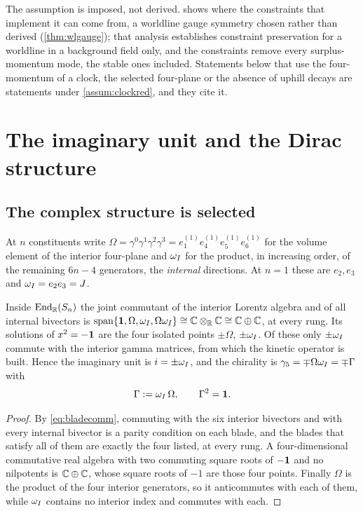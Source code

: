 The assumption is imposed, not derived.  shows where the constraints that implement it can come from, a worldline
gauge symmetry chosen rather than derived (\cref{thm:wlgauge}); that analysis establishes constraint preservation for a worldline in a
background field only, and the constraints remove every surplus-momentum mode, the stable ones included. Statements below that use the
four-momentum of a clock, the selected four-plane or the absence of uphill decays are statements under \cref{assum:clockred}, and they cite
it.



\section{The imaginary unit and the Dirac structure}
\label{sec:dirac}

\subsection{The complex structure is selected}

At $n$ constituents write $\Omega=\gamma^0\gamma^1\gamma^2\gamma^3=e^{(1)}_1e^{(1)}_4e^{(1)}_5e^{(1)}_6$ for the volume element of the
interior four-plane and $\omega_I$ for the product, in increasing order, of the remaining $6n-4$ generators, the \emph{internal}
directions. At $n=1$ these are $e_2,e_3$ and $\omega_I=e_2e_3=J$.

\begin{theorem}
\label{thm:i}
Inside $\operatorname{End}_{\mathbb{R}}(S_n)$ the joint commutant of the interior Lorentz algebra and of all internal bivectors is
$\operatorname{span}\{\mathbf 1,\Omega,\omega_I,\Omega\omega_I\}\cong\mathbb{C}\otimes_{\mathbb{R}}\mathbb{C}\cong\mathbb{C}\oplus\mathbb{C}$, at every rung. Its solutions of
$x^2=-\mathbf 1$ are the four isolated points $\pm\Omega$, $\pm\omega_I$. Of these only $\pm\omega_I$ commute with the interior gamma
matrices, from which the kinetic operator is built. Hence the imaginary unit is $i=\pm\omega_I$, and the chirality is
$\gamma_5=\mp\Omega\omega_I=\mp\Gamma$ with
\[
\Gamma:=\omega_I\,\Omega,\qquad \Gamma^2=\mathbf 1 .
\]
\end{theorem}

\begin{proof}
By \eqref{eq:bladecomm}, commuting with the six interior bivectors and with every internal bivector is a parity condition on
each blade, and the blades that satisfy all of them are exactly the four listed, at every rung. A four-dimensional
commutative real algebra with two commuting square roots of $-\mathbf 1$ and no nilpotents is $\mathbb{C}\oplus\mathbb{C}$, whose square roots of
$-1$ are those four points. Finally $\Omega$ is the product of the four interior generators, so it anticommutes with each of
them, while $\omega_I$ contains no interior index and commutes with each.
\end{proof}

